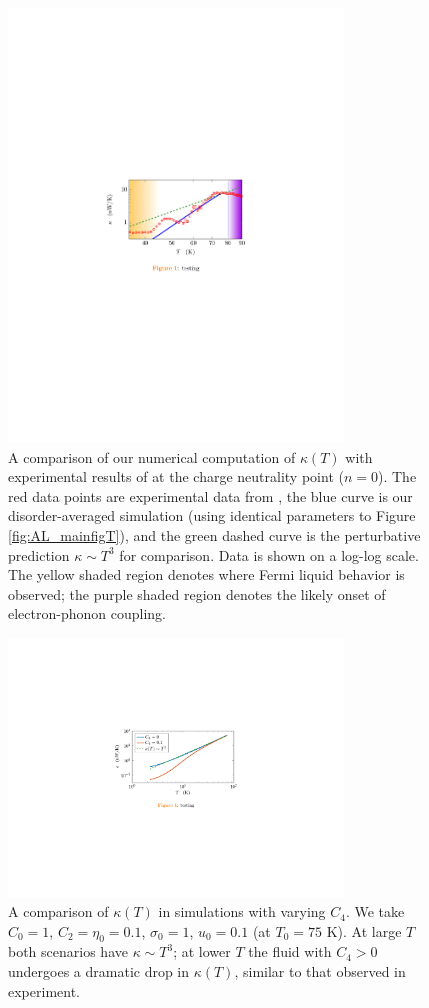 \begin{figure}[t]
\centering
\includegraphics[width=3.5in]{figures/hydro_theory/Tscaleplot.pdf}
\caption{A comparison of our numerical computation of $\kappa(T)$ with experimental results of \cite{crossno_observation_2016}  at the charge neutrality point ($n=0$).   The red data points are experimental data from \cite{crossno_observation_2016}, the blue curve is our disorder-averaged simulation (using identical parameters to Figure \ref{fig:AL_mainfigT}), and the green dashed curve is the perturbative prediction $\kappa \sim T^3$ for comparison.  Data is shown on a log-log scale.  The yellow shaded region denotes where Fermi liquid behavior is observed; the purple shaded region denotes the likely onset of electron-phonon coupling.   }
\label{fig:AL_Tscalefig}
\end{figure}

\begin{figure}[t]
\centering
\includegraphics[width=3.5in]{figures/hydro_theory/kappaTC4plot.pdf}
\caption{A comparison of $\kappa(T)$ in simulations with varying $C_4$.  We take $C_0=1$, $C_2=\eta_0=0.1$, $\sigma_0=1$, $u_0=0.1$ (at $T_0=75$ K).   At large $T$ both scenarios have $\kappa \sim T^3$;  at lower $T$ the fluid with $C_4>0$ undergoes a dramatic drop in $\kappa(T)$, similar to that observed in experiment.}
\label{fig:AL_Tscaletheoryfig}
\end{figure}

